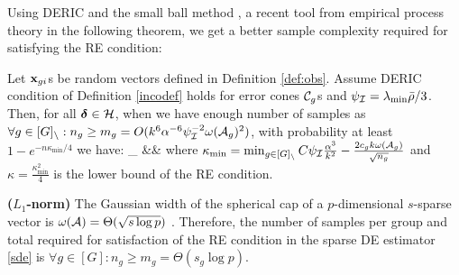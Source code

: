  Using DERIC and the small ball method \cite{mend15}, a recent tool from empirical process theory in the following theorem, we get a better sample complexity required for satisfying the RE condition:
\begin{theorem}
	\label{theo:re}
	Let $\mathbf{x}_{gi}$s	be random vectors defined in Definition \ref{def:obs}.
	Assume DERIC condition of Definition \ref{incodef} holds for error cones $\cC_g$s and $\rinc=\lamin\ratio/3$.
	Then, for all $\ddelta \in \cH$, when we have enough number of samples as $\forall g \in [G]_{\setminus}: n_g \geq m_g = O(k^6 \alpha^{-6} \rinc^{-2} \omega(\cA_g)^2)$, with probability at least $1 - e^{-n \kappa_{\min}/4}$  we have:
	\be
	\nr
	\inf_{\ddelta \in \cH}   &\geq& 
	\ee
	where $\kappa_{\min} = \min_{g\in [G]_\setminus} C \rinc \frac{\alpha^3}{k^2}  - \frac{2 c_g k \omega(\cA_g)}{\sqrt{n_g}}$ and $\kappa = \frac{\kappa_{\min}^2}{4}$ is the lower bound of the RE condition.
\end{theorem}

\begin{example}
	{\bf ($L_1$-norm)} The Gaussian width of the spherical cap of a $p$-dimensional $s$-sparse vector is $\omega(\cA) = \Theta(\sqrt{s\log p})$ \cite{banerjee14, vershynin2018high}. Therefore, the number of samples per group and total required for satisfaction of the RE condition in the sparse DE estimator \eqref{sde} is $\forall g \in [G]: n_g \geq m_g = \Theta(s_g \log p)$. 
\end{example}



